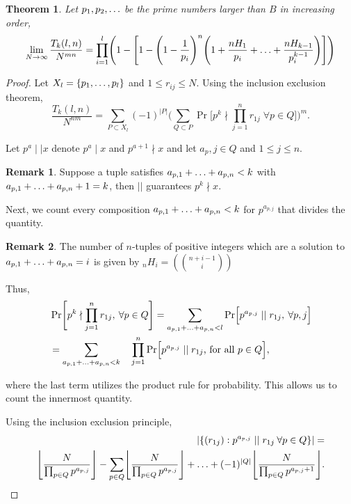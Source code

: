\documentclass[12pt]{amsart}
\newtheorem{theorem}{Theorem}[subsection]
\theoremstyle{definition}
\newtheorem*{remark}{Remark}
\begin{document}
\begin{theorem}
	Let \(p_1, p_2,\mathellipsis\) be the prime numbers larger than \(B\) in increasing order,
	\begin{equation*}
		\lim\limits_{N\to\infty} \frac{T_k(l,n)}{N^{mn}}=\prod_{i=1}^l\Biggl(1-\Biggl[1-\Biggl(1-\frac{1}{p_i}\Biggr)^n\Biggl(1+\frac{nH_1}{p_i}+\mathellipsis+\frac{nH_{k-1}}{p_i^{k-1}}\Biggr)\Biggr]\Biggr)
	\end{equation*}
\end{theorem}

\begin{proof}
	Let \(X_l=\{p_1,\mathellipsis,p_l\}\) and \(1\leq r_{ij}\leq N\). Using the inclusion exclusion theorem, 
	\begin{equation*}
		\frac{T_k(l,n)}{N^{nm}}=\sum_{P\subset X_l}(-1)^{|P|}\Biggl(\sum_{Q\subset P}\Pr\Biggl[p^k\nmid \prod_{j=1}^{n}r_{1j} \; \forall p\in Q \Biggr]\Biggr)^m.
	\end{equation*}
	
	Let \(p^a \mid\mid x\) denote \(p^a\mid x\) and \(p^{a+1}\nmid x\) and let \(a_p,j\in Q\) and \(1\leq j \leq n\).
	
	\begin{remark}
		Suppose a tuple satisfies \(a_{p,1}+\mathellipsis+a_{p,n}<k\) with \(a_{p,1}+\mathellipsis+a_{p,n}+1=k\), then \(||\) guarantees \(p^k \nmid x\).
	\end{remark} 
	
	Next, we count every composition \(a_{p,1}+\mathellipsis+a_{p,n}<k\) for \(p^{a_{p,j}}\) that divides the quantity. 
	\begin{remark}
	   The number of \(n\)-tuples of positive integers which are a solution to \(a_{p,1}+\mathellipsis+a_{p,n}=i\) is given by \(_nH_i = (\binom{n+i-1}{i})\)
	\end{remark}

	Thus,
        \begin{align*}
		&\Pr\Biggl[p^k\nmid \prod_{j=1}^{n}r_{1j},\:\forall p\in Q\Biggr] = \sum_{a_{p,1}+\mathellipsis+a_{p,n}<l}\Pr\Bigl[p^{a_{p,j}} \mid\mid r_{1j},\: \forall p,j\Bigr]\\
		&=\sum_{a_{p,1}+\mathellipsis+a_{p,n}<k}\quad\prod_{j=1}^{n}\Pr\Bigl[p^{a_{p,j}} \mid\mid r_{1j} \text{, for all } p\in Q\Bigr],  
	\end{align*}
	
	where the last term utilizes the product rule for probability. This allows us to count the innermost quantity. 
	
	Using the inclusion exclusion principle, 
	\begin{align*}
		|\{(r_{1j}): p^{a_{{p,j}}}\mid\mid r_{1j} \: \forall p\in Q\}| = \\
		\Biggl\lfloor\frac{N}{\prod_{p\in Q}p^{a_{p,j}}}\Biggr\rfloor-\sum_{p\in Q}\Biggl\lfloor \frac{N}{\prod_{p\in Q}p^{a_{p,j}}}\Biggr\rfloor+\mathellipsis+(-1)^{|Q|}\Biggl\lfloor\frac{N}{\prod_{p\in Q}p^{a_{p,j}+1}}\Biggr\rfloor.
	\end{align*}
	

\end{proof}
\end{document}

